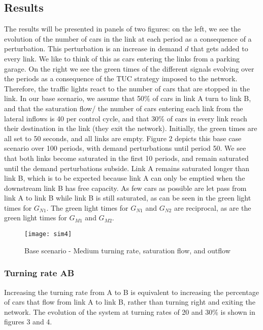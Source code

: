 \documentclass[11pt]{article}
\begin{document}
\subsection{Results}

The results will be presented in panels of two figures: on the left, we see the evolution of the number of cars in the link at each period as a consequence of a perturbation. This perturbation is an increase in demand $d$ that gets added to every link. We like to think of this as cars entering the links from a parking garage. 
On the right we see the green times of the different signals evolving over the periods as a consequence of the TUC strategy imposed to the network. Therefore, the traffic lights react to the number of cars that are stopped in the link. In our base scenario, we assume that 50\% of cars in link A turn to link B, and that the saturation flow/ the number of cars entering each link from the lateral inflows is 40 per control cycle, and that 30\% of cars in every link reach their destination in the link (they exit the network). Initially, the green times are all set to 50 seconds, and all links are empty. Figure 2 depicts this base case scenario over 100 periods, with demand perturbations until period 50. We see that both links become saturated in the first 10 periods, and remain saturated until the demand perturbations subside. Link A remains saturated longer than link B, which is to be expected because link A can only be emptied when the downstream link B has free capacity. As few cars as possible are let pass from link A to link B while link B is still saturated, as can be seen in the green light times for $G_{N1}$. The green light times for  $G_{N1}$ and  $G_{N2}$ are reciprocal, as are the green light times for $G_{M1}$ and  $G_{M2}$. 

\begin{figure}[h!]
    \caption{Base scenario - Medium turning rate, saturation flow, and outflow}
      \centering
	\texttt{[image: sim4]}
\end{figure}

\subsubsection{Turning rate AB}


Increasing the turning rate from A to B is equivalent to increasing the percentage of cars that flow from link A to link B, rather than turning right and exiting the network. The evolution of the system at turning rates of 20 and 30\% is shown in figures 3 and 4.
\end{document}
